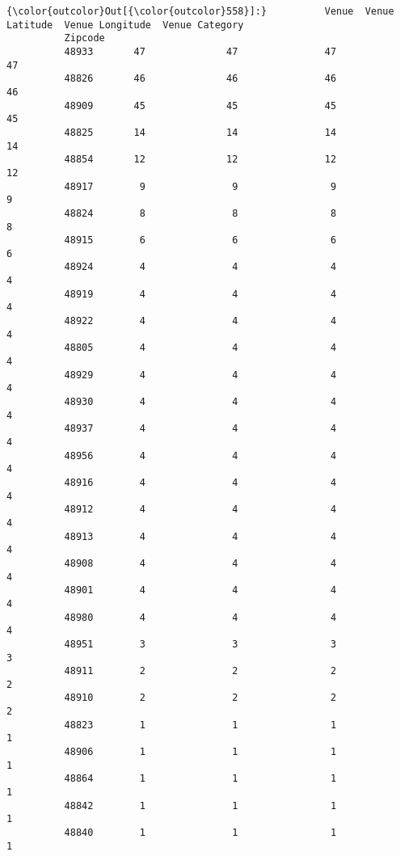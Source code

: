 \documentclass[11pt]{article}
\begin{document}
\begin{Verbatim}[commandchars=\\\{\}]
{\color{outcolor}Out[{\color{outcolor}558}]:}          Venue  Venue Latitude  Venue Longitude  Venue Category
          Zipcode                                                        
          48933       47              47               47              47
          48826       46              46               46              46
          48909       45              45               45              45
          48825       14              14               14              14
          48854       12              12               12              12
          48917        9               9                9               9
          48824        8               8                8               8
          48915        6               6                6               6
          48924        4               4                4               4
          48919        4               4                4               4
          48922        4               4                4               4
          48805        4               4                4               4
          48929        4               4                4               4
          48930        4               4                4               4
          48937        4               4                4               4
          48956        4               4                4               4
          48916        4               4                4               4
          48912        4               4                4               4
          48913        4               4                4               4
          48908        4               4                4               4
          48901        4               4                4               4
          48980        4               4                4               4
          48951        3               3                3               3
          48911        2               2                2               2
          48910        2               2                2               2
          48823        1               1                1               1
          48906        1               1                1               1
          48864        1               1                1               1
          48842        1               1                1               1
          48840        1               1                1               1
\end{Verbatim}
            
\end{document}
